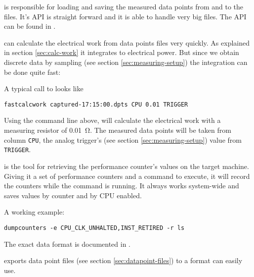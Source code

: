 \label{sec:special-developments}


\JWlfour{\JWTlibdp}

\JWTlibdp is responsible for loading and saving the measured data points from
and to the \JWTprotobuf files. It's API is straight forward and it is able to
handle very big files. The API can be found in
.


\JWlfour{\JWTfcw}

\JWTfcw can calculate the electrical work from data points files very quickly.
As explained in section \ref{sec:calc-work} it integrates to electrical power.
But since we obtain discrete data by sampling (see section
\ref{sec:measuring-setup}) the integration can be done quite fast:


A typical call to \JWTfcw looks like

\begin{lstlisting}[style=Shell]
fastcalcwork captured-17:15:00.dpts CPU 0.01 TRIGGER
\end{lstlisting}

Using the command line above, \JWTfcw will calculate the electrical work with a
measuring resistor of \SI{0.01}{\ohm}. The measured data points will be taken
from column \texttt{CPU}, the analog trigger's (see section
\ref{sec:measuring-setup}) value from \texttt{TRIGGER}.


\JWlfour{\JWTdc}

\JWTdc is the tool for retrieving the performance counter's values on the target
machine. Giving it a set of performance counters and a command to execute, it
will record the counters while the command is running. It always works
system-wide and saves values by counter and by CPU enabled.

A working example:

\begin{lstlisting}[style=Shell]
dumpcounters -e CPU_CLK_UNHALTED,INST_RETIRED -r ls
\end{lstlisting}

The exact data format is documented in .

\JWlfour{\JWTde}

\JWTde exports data point files (see section \ref{sec:datapoint-files}) to a
format \JWTR can easily use.

